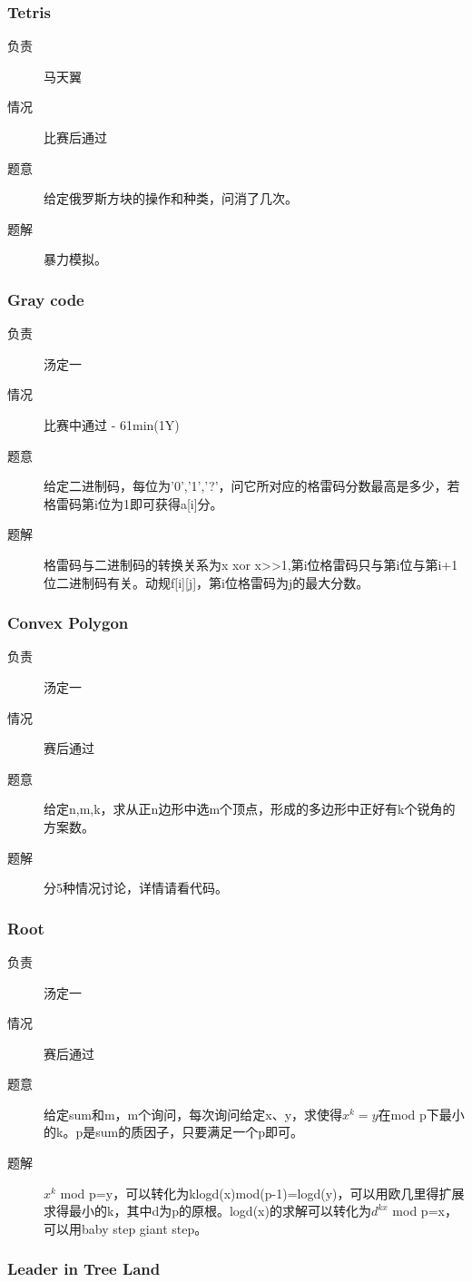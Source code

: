 \documentclass[a4paper, 11pt, nofonts, nocap, fancyhdr]{ctexart}
\newcommand{\problem}[1]{\subsubsection{#1}}
\begin{document}
\problem{Tetris}

\begin{description}
\item[负责] 马天翼
\item[情况] 比赛后通过
\item[题意]
给定俄罗斯方块的操作和种类，问消了几次。
\item[题解]
暴力模拟。
\end{description}

\problem{Gray code}

\begin{description}
\item[负责] 汤定一
\item[情况] 比赛中通过 - 61min(1Y)
\item[题意]
给定二进制码，每位为'0','1','?'，问它所对应的格雷码分数最高是多少，若格雷码第i位为1即可获得a[i]分。
\item[题解]
格雷码与二进制码的转换关系为x xor x>>1,第i位格雷码只与第i位与第i+1位二进制码有关。动规f[i][j]，第i位格雷码为j的最大分数。
\end{description}

\problem{Convex Polygon}

\begin{description}
\item[负责] 汤定一
\item[情况] 赛后通过
\item[题意]
给定n,m,k，求从正n边形中选m个顶点，形成的多边形中正好有k个锐角的方案数。
\item[题解]
分5种情况讨论，详情请看代码。
\end{description}

\problem{Root}

\begin{description}
\item[负责] 汤定一
\item[情况] 赛后通过
\item[题意]
给定sum和m，m个询问，每次询问给定x、y，求使得$x^k=y$在mod p下最小的k。p是sum的质因子，只要满足一个p即可。
\item[题解]
$x^k$ mod p=y，可以转化为klogd(x)mod(p-1)=logd(y)，可以用欧几里得扩展求得最小的k，其中d为p的原根。logd(x)的求解可以转化为$d^{kx}$ mod p=x，可以用baby step giant step。
\end{description}

\problem{Leader in Tree Land}
\end{document}
